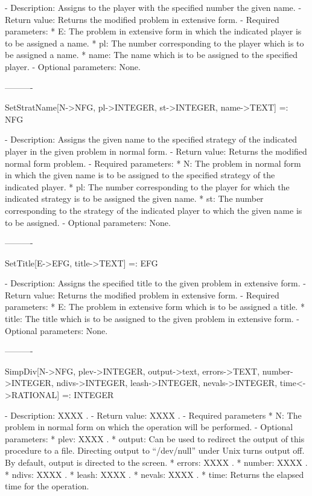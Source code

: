    -	Description:  Assigns to the player with the specified number the given
	name.
   -	Return value:  Returns the modified problem in extensive form.
   -	Required parameters:
	  *  E:  The problem in extensive form in which the indicated player is
		to be assigned a name.
	  *  pl:  The number corresponding to the player which is to be 
		assigned a name.
	  *  name:  The name which is to be assigned to the specified player.
   -	Optional parameters:  None.

----------

SetStratName[N->NFG, pl->INTEGER, st->INTEGER, name->TEXT] =: NFG

   -	Description:  Assigns the given name to the specified strategy of the
	indicated player in the given problem in normal form.
   -	Return value:  Returns the modified normal form problem.
   -	Required parameters:
	  *  N:  The problem in normal form in which the given name is to be
		assigned to the specified strategy of the indicated player.
	  *  pl:  The number corresponding to the player for which the 
		indicated strategy is to be assigned the given name.
	  *  st:  The number corresponding to the strategy of the indicated 
		player to which the given name is to be assigned.
   -	Optional parameters:  None.

----------

SetTitle[E->EFG, title->TEXT] =: EFG

   -	Description:  Assigns the specified title to the given problem in 
	extensive form.
   -	Return value:  Returns the modified problem in extensive form.
   -	Required parameters:
	  *  E:  The problem in extensive form which is to be assigned a title.
	  *  title:  The title which is to be assigned to the given problem in 
		extensive form.
  -	Optional parameters:  None.

----------

SimpDiv[N->NFG, {plev->INTEGER}, {output->text}, {errors->TEXT},
	{number->INTEGER}, {ndivs->INTEGER}, {leash->INTEGER}, 
	{nevals->INTEGER}, {time<->RATIONAL}] =: INTEGER

   -	Description:  XXXX .
   -	Return value:  XXXX .
   -	Required parameters
	  *  N:  The problem in normal form on which the operation will be 
		performed.
   -	Optional parameters:
	  *  plev: XXXX .
	  *  output:  Can be used to redirect the output of this procedure to a
		file.  Directing output to ``/dev/null'' under Unix turns 
		output off.  By default, output is directed to the screen.
	  *  errors:  XXXX .
	  *  number:  XXXX .
	  *  ndivs:  XXXX .
	  *  leash:  XXXX .
	  *  nevals:  XXXX .
	  *  time:  Returns the elapsed time for the operation.

